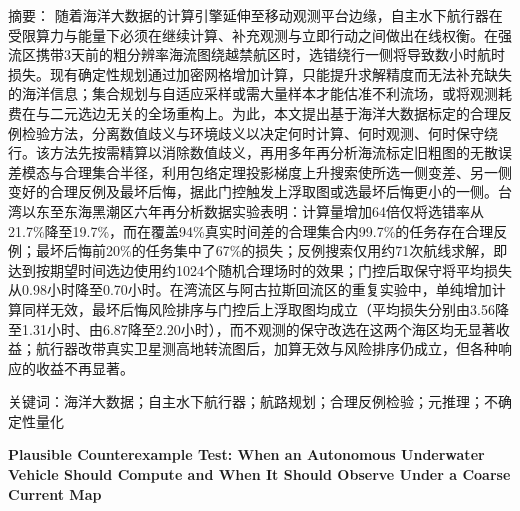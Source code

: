 {\heiti 摘要：}
随着海洋大数据的计算引擎延伸至移动观测平台边缘，自主水下航行器在受限算力与能量下必须在继续计算、补充观测与立即行动之间做出在线权衡。在强流区携带3天前的粗分辨率海流图绕越禁航区时，选错绕行一侧将导致数小时航时损失。现有确定性规划通过加密网格增加计算，只能提升求解精度而无法补充缺失的海洋信息；集合规划与自适应采样或需大量样本才能估准不利流场，或将观测耗费在与二元选边无关的全场重构上。为此，本文提出基于海洋大数据标定的合理反例检验方法，分离数值歧义与环境歧义以决定何时计算、何时观测、何时保守绕行。该方法先按需精算以消除数值歧义，再用多年再分析海流标定旧粗图的无散误差模态与合理集合半径，利用包络定理投影梯度上升搜索使所选一侧变差、另一侧变好的合理反例及最坏后悔，据此门控触发上浮取图或选最坏后悔更小的一侧。台湾以东至东海黑潮区六年再分析数据实验表明：计算量增加64倍仅将选错率从21.7\%降至19.7\%，而在覆盖94\%真实时间差的合理集合内99.7\%的任务存在合理反例；最坏后悔前20\%的任务集中了67\%的损失；反例搜索仅用约71次航线求解，即达到按期望时间选边使用约1024个随机合理场时的效果；门控后取保守将平均损失从0.98小时降至0.70小时。在湾流区与阿古拉斯回流区的重复实验中，单纯增加计算同样无效，最坏后悔风险排序与门控后上浮取图均成立（平均损失分别由3.56降至1.31小时、由6.87降至2.20小时），而不观测的保守改选在这两个海区均无显著收益；航行器改带真实卫星测高地转流图后，加算无效与风险排序仍成立，但各种响应的收益不再显著。

{\heiti 关键词：}海洋大数据；自主水下航行器；航路规划；合理反例检验；元推理；不确定性量化

\vspace{1em}
\begin{center}
{\large\bfseries Plausible Counterexample Test: When an Autonomous Underwater Vehicle Should Compute and When It Should Observe Under a Coarse Current Map}
\end{center}
\vspace{0.5em}

